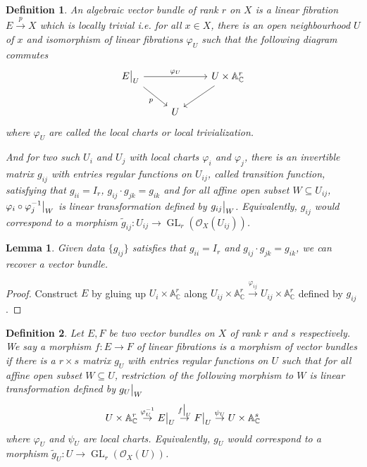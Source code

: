 \documentclass{ctexart}
\newtheorem{definition}{Definition}[section]
\newtheorem{lemma}{Lemma}[section]
\newcommand{\generallineargroup}[2]{\operatorname{GL}_{#1}(#2)}
\begin{document}
\begin{definition}
    An algebraic vector bundle of rank $r$ on $X$ is a linear fibration $E \overset{p}{\rightarrow} X$ which is locally trivial i.e. for all $x\in X$,
    there is an open neighbourhood $U$ of $x$ and isomorphism of linear fibrations $\varphi_{U}$ such that the following diagram commutes
    \begin{equation}
        \begin{tikzcd}
            E\big{|}_{U} \arrow[rr, "\varphi_{U}"] \arrow[dr, "p" swap] &&
            U \times \mathbb{A}_{\mathbb{C}}^{r} \arrow[dl] \\
            & U &
        \end{tikzcd}
    \end{equation}
    where $\varphi_{U}$ are called the local charts or local trivialization.
    \par
    And for two such $U_{i}$ and $U_{j}$ with local charts $\varphi_{i}$ and $\varphi_{j}$,
    there is an invertible matrix $g_{ij}$ with entries regular functions on $U_{ij}$, called transition function,
    satisfying that $g_{ii} = I_{r}$, $g_{ij} \cdot g_{jk} = g_{ik}$ and for all affine open subset $W \subseteq U_{ij}$,
    $\varphi_{i} \circ \varphi_{j}^{-1}\big{|}_{W}$ is linear transformation defined by $g_{ij}\big{|}_{W}$.
    Equivalently, $g_{ij}$ would correspond to a morphism $\widetilde{g}_{ij}: U_{ij} \rightarrow \generallineargroup{r}{\mathcal{O}_{X}(U_{ij})}$.
\end{definition}
\begin{lemma}
    Given data $\{g_{ij}\}$ satisfies that $g_{ii} = I_{r}$ and $g_{ij} \cdot g_{jk} = g_{ik}$, we can recover a vector bundle.
    \label{Lemma 1.3}
\end{lemma}
\begin{proof}
    Construct $E$ by gluing up $U_{i} \times \mathbb{A}_{\mathbb{C}}^{r}$ along $U_{ij} \times \mathbb{A}_{\mathbb{C}}^{r} \overset{\varphi_{ij}}{\rightarrow} U_{ij} \times \mathbb{A}_{\mathbb{C}}^{r}$ defined by $g_{ij}$.
\end{proof}
\begin{definition}
    Let $E, F$ be two vector bundles on $X$ of rank $r$ and $s$ respectively.
    We say a morphism $f: E \rightarrow F$ of linear fibrations is a morphism of vector bundles if there is a $r \times s$ matrix $g_{U}$ with entries regular functions on $U$ such that for all affine open subset $W \subseteq U$, 
    restriction of the following morphism to $W$ is linear transformation defined by $g_{U}\big{|}_{W}$
    \begin{equation}
        U \times \mathbb{A}_{\mathbb{C}}^{r} \overset{\varphi_{U}^{-1}}{\rightarrow} E\big{|}_{U} \overset{f\big{|}_{U}}{\rightarrow} F\big{|}_{U} \overset{\psi_{U}}{\rightarrow} U \times \mathbb{A}_{\mathbb{C}}^{s}
    \end{equation}
    where $\varphi_{U}$ and $\psi_{U}$ are local charts.
    Equivalently, $g_{U}$ would correspond to a morphism $\widetilde{g}_{U}: U \rightarrow \generallineargroup{r}{\mathcal{O}_{X}(U)}$.
\end{definition}
\end{document}

